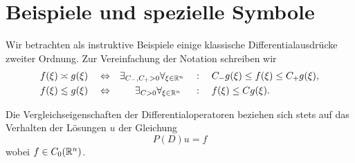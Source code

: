 \section{Beispiele und spezielle Symbole}

Wir betrachten als instruktive Beispiele
einige klassische Differentialausdrücke zweiter Ordnung.
Zur Vereinfachung der Notation schreiben wir
\begin{subequations}
\begin{align}
f(\xi)\asymp g(\xi)\quad&\gdw&
\exists_{C_-,C_+>0}\forall_{\xi\in\R^n}\quad&:\quad C_-g(\xi)\leq f(\xi)\leq C_+g(\xi),\\
f(\xi)\apprle g(\xi)\quad&\gdw&
\exists_{C>0}\forall_{\xi\in\R^n}~\quad&:\quad f(\xi)\leq Cg(\xi).
\end{align}
\end{subequations}

Die Vergleichseigenschaften der Differentialoperatoren
beziehen sich stets auf das Verhalten der Lösungen $u$ der Gleichung
\begin{equation}
P(D)u=f
\end{equation}
wobei $f\in C_0(\mathbb R^n)$.

